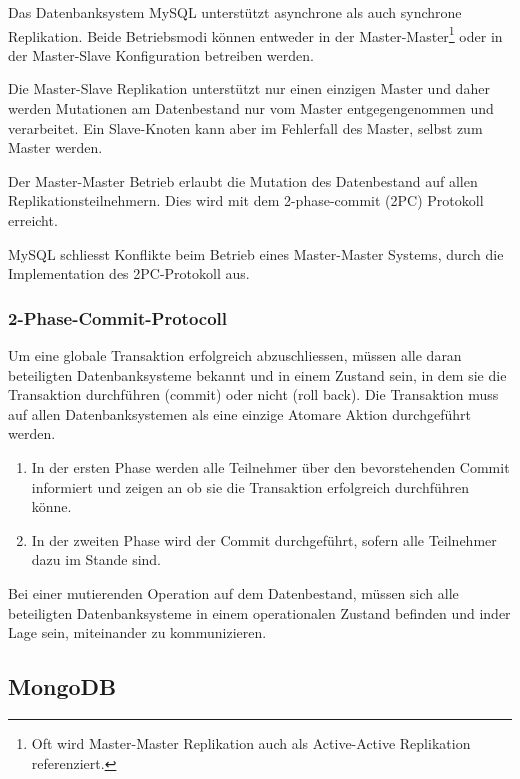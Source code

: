 \documentclass[oneside,11pt,parskip=half,ngerman]{scrreprt}
\begin{document}
Das Datenbanksystem MySQL unterstützt asynchrone als auch synchrone
Replikation. Beide Betriebsmodi können entweder in der
Master-Master\footnote{Oft wird Master-Master Replikation auch als
  Active-Active Replikation referenziert.} oder in der Master-Slave
Konfiguration betreiben werden.

Die Master-Slave Replikation unterstützt nur einen einzigen Master und
daher werden Mutationen am Datenbestand nur vom Master entgegengenommen
und verarbeitet. Ein Slave-Knoten kann aber im Fehlerfall des Master,
selbst zum Master werden.

Der Master-Master Betrieb erlaubt die Mutation des Datenbestand auf
allen Replikationsteilnehmern. Dies wird mit dem 2-phase-commit (2PC)
Protokoll erreicht.

MySQL schliesst Konflikte beim Betrieb eines Master-Master Systems,
durch die Implementation des 2PC-Protokoll aus.

\subsubsection{2-Phase-Commit-Protocoll}\label{phase-commit-protocoll}

Um eine globale Transaktion erfolgreich abzuschliessen, müssen alle
daran beteiligten Datenbanksysteme bekannt und in einem Zustand sein, in
dem sie die Transaktion durchführen (commit) oder nicht (roll back). Die
Transaktion muss auf allen Datenbanksystemen als eine einzige Atomare
Aktion durchgeführt werden.

\begin{enumerate}
\def\labelenumi{\arabic{enumi}.}
\itemsep1pt\parskip0pt
\item
  In der ersten Phase werden alle Teilnehmer über den bevorstehenden
  Commit informiert und zeigen an ob sie die Transaktion erfolgreich
  durchführen könne.
\item
  In der zweiten Phase wird der Commit durchgeführt, sofern alle
  Teilnehmer dazu im Stande sind.
\end{enumerate}

Bei einer mutierenden Operation auf dem Datenbestand, müssen sich alle
beteiligten Datenbanksysteme in einem operationalen Zustand befinden und
inder Lage sein, miteinander zu kommunizieren. \autocite{mysqlhandbook}

\subsection{MongoDB}\label{mongodb}
\end{document}

